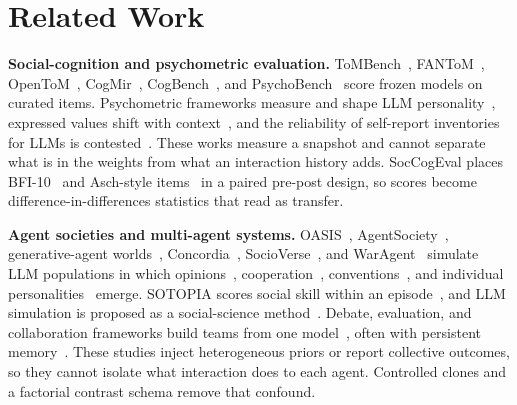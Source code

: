 \section{Related Work}\label{sec:related}

\textbf{Social-cognition and psychometric evaluation.} ToMBench~\citep{ToMBench}, FANToM~\citep{Kim2023_FANTOM}, OpenToM~\citep{Xu2024_OpenToM}, CogMir~\citep{CogMir}, CogBench~\citep{CogBench}, and PsychoBench~\citep{PsychoBench} score frozen models on curated items. Psychometric frameworks measure and shape LLM personality~\citep{SerapioGarcia2025_PsychometricLLM,Ye2025_LLM_Psychometrics}, expressed values shift with context~\citep{Kovac2024_StickToRole}, and the reliability of self-report inventories for LLMs is contested~\citep{Binz2023,Shu2024_PsychReliability,Gupta2024_SelfAssessment,Huang2024_ScaleReliability,Lee2025_TRAIT,Jiang2024_PersonaLLM,Han2025_PersonalityIllusion}. These works measure a snapshot and cannot separate what is in the weights from what an interaction history adds. SocCogEval places BFI-10~\citep{Rammstedt2007_BFI10,PsychoBench} and Asch-style items~\citep{Asch1956_Conformity} in a paired pre-post design, so scores become difference-in-differences statistics that read as transfer.

\textbf{Agent societies and multi-agent systems.} OASIS~\citep{OASIS}, AgentSociety~\citep{AgentSociety}, generative-agent worlds~\citep{Generative_Agents,Park2024_1000}, Concordia~\citep{Concordia}, SocioVerse~\citep{Li2024_SocioVerse}, and WarAgent~\citep{Hua2024_WarAgent} simulate LLM populations in which opinions~\citep{Chuang2024_OpinionDynamics,CisnerosVelarde2025_Funding}, cooperation~\citep{Piatti2024_GovSim}, conventions~\citep{FlintAshery2025_Conventions}, and individual personalities~\citep{Takata2024} emerge. SOTOPIA scores social skill within an episode~\citep{Zhou2024_SOTOPIA}, and LLM simulation is proposed as a social-science method~\citep{Anthis2025_SocialSim,Mou2024_SocialSimSurvey}. Debate, evaluation, and collaboration frameworks build teams from one model~\citep{Du2024_MultiagentDebate,Liang2024_DivergentDebate,Du2024_Debate,Smit2024_MAD,Chan2024_ChatEval,Li2023_CAMEL,Wu2024_AutoGen,Hong2024_MetaGPT}, often with persistent memory~\citep{MemGPT,Xu2025_AMEM,Mem0}. These studies inject heterogeneous priors or report collective outcomes, so they cannot isolate what interaction does to each agent. Controlled clones and a factorial contrast schema remove that confound.


